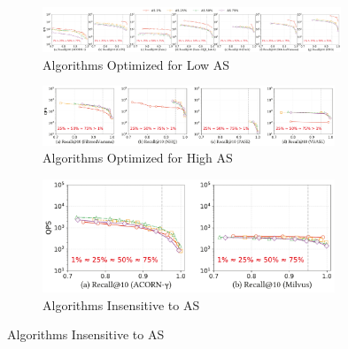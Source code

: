 \documentclass[sigconf, nonacm, pdfa]{acmart}
\begin{document}
{	
	
	\begin{figure}
		\centering
		
		\begin{subfigure}{\textwidth}
			\centering
			
			\includegraphics[width=0.98\textwidth]{figures/exp/exp_5_2_1.pdf}
			\caption{Algorithms Optimized for Low AS}
			\label{fig:exp_5_2_1}
		\end{subfigure}
		
		\vfill %
		
		\begin{subfigure}{0.64\textwidth} %
			\centering
			
			\includegraphics[width=0.96\textwidth]{figures/exp/exp_5_2_2.pdf}
			\caption{Algorithms Optimized for High AS}
			\label{fig:exp_5_2_2}
		\end{subfigure}
		\hspace{1mm} %
		\begin{subfigure}{0.34\textwidth} %
			\centering
			
			\includegraphics[width=0.96\textwidth]{figures/exp/exp_5_2_3.pdf}
			\caption{Algorithms Insensitive to AS}
			\label{fig:exp_5_2_3}
		\end{subfigure}
		
		\setlength{\abovecaptionskip}{0.15cm}
		\setlength{\belowcaptionskip}{-0.10cm}
		

\end{figure}}
\end{document}
